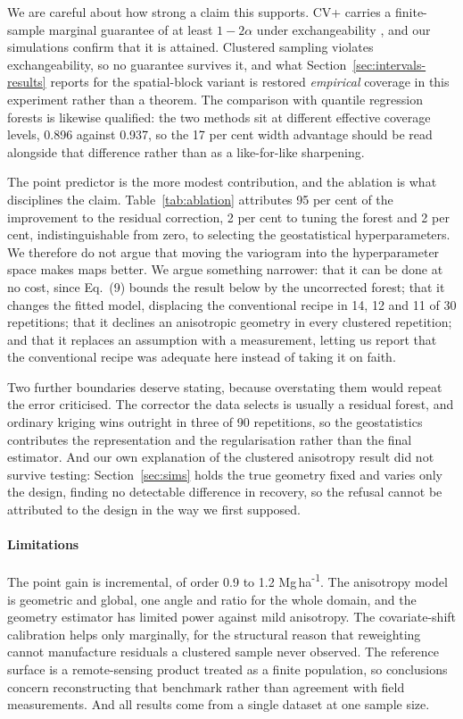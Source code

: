 \documentclass[preprint,12pt,authoryear]{elsarticle}
\newcommand{\Mgha}{Mg\,ha\textsuperscript{-1}}
\begin{document}
We are careful about how strong a claim this supports. CV+ carries a
finite-sample marginal guarantee of at least $1-2\alpha$ under exchangeability
\citep{barber2021}, and our simulations confirm that it is attained. Clustered
sampling violates exchangeability, so no guarantee survives it, and what
Section~\ref{sec:intervals-results} reports for the spatial-block variant is
restored \emph{empirical} coverage in this experiment rather than a theorem. The
comparison with quantile regression forests is likewise qualified: the two
methods sit at different effective coverage levels, 0.896 against 0.937, so the
17 per cent width advantage should be read alongside that difference rather than
as a like-for-like sharpening.

The point predictor is the more modest contribution, and the ablation is what
disciplines the claim. Table~\ref{tab:ablation} attributes 95 per cent of the
improvement to the residual correction, 2 per cent to tuning the forest and 2
per cent, indistinguishable from zero, to selecting the geostatistical
hyperparameters. We therefore do not argue that moving the variogram into the
hyperparameter space makes maps better. We argue something narrower: that it can
be done at no cost, since Eq.~(9) bounds the result below by the uncorrected
forest; that it changes the fitted model, displacing the conventional recipe in
14, 12 and 11 of 30 repetitions; that it declines an anisotropic geometry in
every clustered repetition; and that it replaces an assumption with a
measurement, letting us report that the conventional recipe was adequate here
instead of taking it on faith.

Two further boundaries deserve stating, because overstating them would repeat
the error \citet{wadoux2021} criticised. The corrector the data selects is
usually a residual forest, and ordinary kriging wins outright in three of 90
repetitions, so the geostatistics contributes the representation and the
regularisation rather than the final estimator. And our own explanation of the
clustered anisotropy result did not survive testing: Section~\ref{sec:sims}
holds the true geometry fixed and varies only the design, finding no detectable
difference in recovery, so the refusal cannot be attributed to the design in the
way we first supposed.

\paragraph{Limitations} The point gain is incremental, of order 0.9 to 1.2
\Mgha{}. The anisotropy model is geometric and global, one angle and ratio for
the whole domain, and the geometry estimator has limited power against mild
anisotropy. The covariate-shift calibration helps only marginally, for the
structural reason that reweighting cannot manufacture residuals a clustered
sample never observed. The reference surface is a remote-sensing product treated
as a finite population, so conclusions concern reconstructing that benchmark
rather than agreement with field measurements. And all results come from a
single dataset at one sample size.
\end{document}
